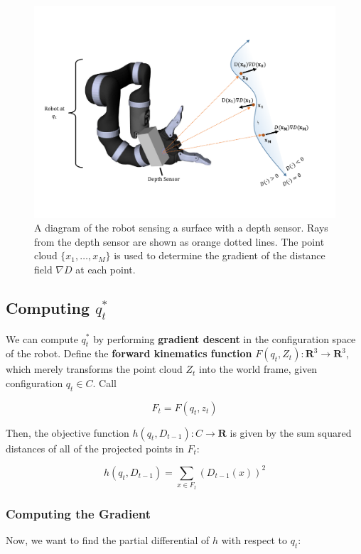 \documentclass{article}
\begin{document}
\begin{figure}
	\centering
	\includegraphics[width=1.0\textwidth]{img/robot_reconstruct.pdf}
	\caption{A diagram of the robot sensing a surface with a depth sensor. Rays
	from the depth sensor are shown as orange dotted lines. The point cloud
	$\{x_1, \ldots, x_M\}$ is used to determine the gradient of the distance field
	$\nabla D$ at each point.}
	\label{fig:robot}
\end{figure}

\subsection{Computing $q^*_t$}

We can compute $q^*_t$ by performing \textbf{gradient descent} in the
configuration space of the robot.  Define the \textbf{forward kinematics
function} $F(q_t, Z_t) : \mathbf{R}^3 \to \mathbf{R}^3$, which merely
transforms the point cloud $Z_t$ into the world frame, given configuration $q_t
\in C$. Call

$$ F_t = F(q_t, z_t) $$

Then, the objective function $h(q_t, D_{t-1}) : C \to \mathbf{R}$ is given by
the sum squared distances of all of the projected points in $F_t$:

$$ h(q_t, D_{t-1}) = \sum_{x \in F_t}\left(D_{t-1}(x)\right) ^2 $$

\subsubsection{Computing the Gradient}

Now, we want to find the partial differential of $h$ with respect to $q_t$:
\end{document}
